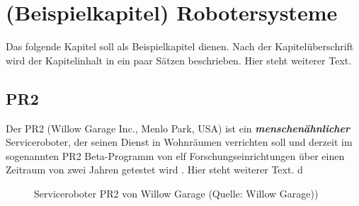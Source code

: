 \chapter{(Beispielkapitel) Robotersysteme}

Das folgende Kapitel soll als Beispielkapitel dienen. Nach der Kapitelüberschrift wird der Kapitelinhalt in ein paar Sätzen beschrieben.
Hier steht weiterer Text.

\section{PR2}

Der PR2 (Willow Garage Inc., Menlo Park, USA) ist ein \textbf{\textit{menschenähnlicher}} Serviceroboter, der seinen Dienst in Wohnräumen verrichten soll und derzeit im sogenannten PR2 Beta-Programm von elf Forschungseinrichtungen über einen Zeitraum von zwei Jahren getestet wird \cite{WillowGarage2010}.
Hier steht weiterer Text.  d

\begin{figure}[!ht]
	\centering
	\subfigure[]{\texttt{[image: PR2-1]}}
	\hspace{5mm}
	\subfigure[]{\texttt{[image: PR2-2]}}
	\hspace{5mm}
	\subfigure[]{\texttt{[image: PR2-3]}}
	\caption{Serviceroboter PR2 von Willow Garage (Quelle: Willow Garage))}
	\label{fig.PR2}
\end{figure}


